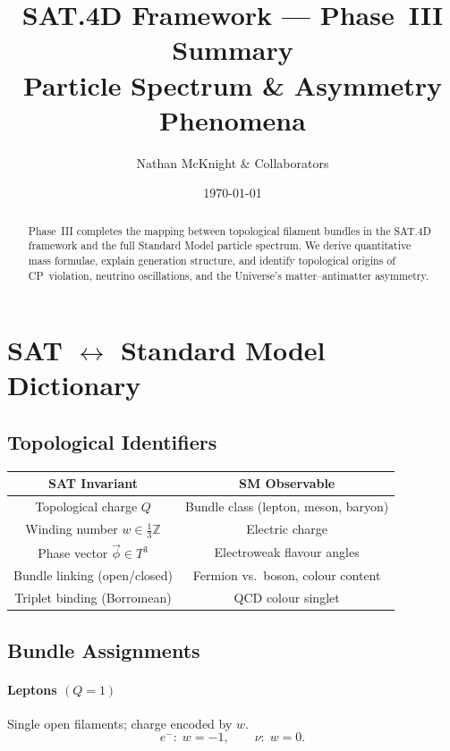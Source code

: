 \documentclass[11pt]{article}
\title{\textbf{SAT.4D Framework --- Phase~III Summary}\\Particle Spectrum \& Asymmetry Phenomena}
\author{Nathan McKnight \& Collaborators}
\date{\today}
\begin{document}
\maketitle

\begin{abstract}
Phase~III completes the mapping between topological filament bundles in the SAT.4D
framework and the full Standard Model particle spectrum.
We derive quantitative mass formulae, explain generation structure, and identify 
topological origins of CP~violation, neutrino oscillations, and the Universe's
matter--antimatter asymmetry.
\end{abstract}

\tableofcontents

\section{SAT $\leftrightarrow$ Standard Model Dictionary}

\subsection{Topological Identifiers}

\begin{center}
\begin{tabular}{|c|c|}
\hline
SAT Invariant & SM Observable\\\hline
Topological charge $Q$ & Bundle class (lepton, meson, baryon) \\
Winding number $w\in\frac13\mathbb Z$ & Electric charge \\
Phase vector $\vec\phi\in T^3$ & Electroweak flavour angles \\
Bundle linking (open/closed) & Fermion vs.\ boson, colour content \\
Triplet binding (Borromean) & QCD colour singlet \\\hline
\end{tabular}
\end{center}

\subsection{Bundle Assignments}

\paragraph{Leptons $(Q=1)$}
Single open filaments; charge encoded by $w$.  
\[
e^-:\; w=-1, \qquad \nu:\; w=0.
\]
\end{document}
